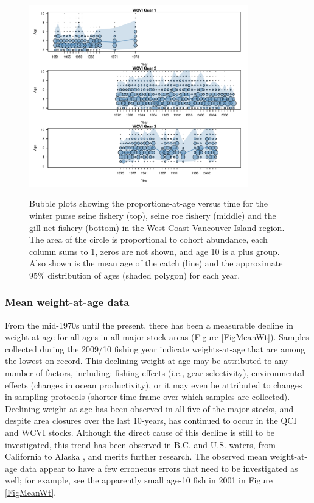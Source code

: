 \begin{figure}
	\centering
	\includegraphics[width=0.85\textwidth]{../Figs/iscam_fig_AgeCompsWCVI.pdf}\\
	\caption{Bubble plots showing the proportions-at-age versus time for the winter purse seine fishery (top), seine roe fishery (middle) and the gill net fishery (bottom) in the West Coast Vancouver Island region.  The area of the circle is proportional to cohort abundance, each column sums to 1, zeros are not shown, and age 10 is a plus group. Also shown is the mean age of the catch (line) and the approximate 95\% distribution of ages (shaded polygon) for each year.}\label{FigAgeCompsWCVI}
\end{figure}





	\subsubsection{Mean weight-at-age data}

	From the mid-1970s until the present, there has been a measurable decline in weight-at-age for all ages in all major stock areas (Figure \ref{FigMeanWt}). Samples collected during the 2009/10 fishing year indicate weights-at-age that are among the lowest on record. This declining weight-at-age may be attributed to any number of factors, including: fishing effects (i.e., gear selectivity), environmental effects (changes in ocean productivity), or it may even be attributed to changes in sampling protocols (shorter time frame over which samples are collected). Declining weight-at-age has been observed in all five of the major stocks, and despite area closures over the last 10-years, has continued to occur in the QCI and WCVI stocks. Although the direct cause of this decline is still to be investigated, this trend has been observed in B.C. and U.S. waters, from California to Alaska \citep{schweigert2002herring}, and merits further research.	The observed mean weight-at-age data appear to have a few erroneous errors that need to be investigated as well; for example, see the apparently small age-10 fish in 2001 in Figure \ref{FigMeanWt}.

